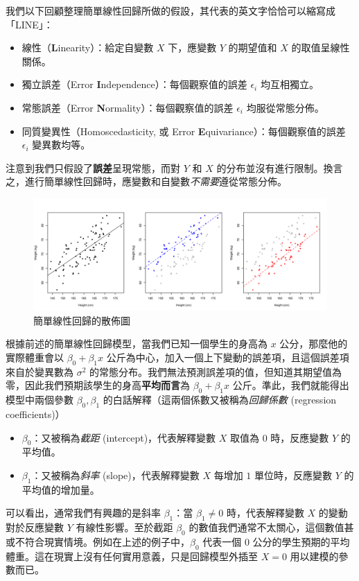     我們以下回顧整理簡單線性回歸所做的假設，其代表的英文字恰恰可以縮寫成「LINE」：
    \begin{itemize}
        \item 線性（\textbf{L}inearity）：給定自變數 $X$ 下，應變數 $Y$ 的期望值和 $X$ 的取值呈線性關係。
        \item 獨立誤差（Error \textbf{I}ndependence）：每個觀察值的誤差 $\epsilon_i$ 均互相獨立。
        \item 常態誤差（Error \textbf{N}ormality）：每個觀察值的誤差 $\epsilon_i$ 均服從常態分佈。
        \item 同質變異性（Homoscedasticity, 或 Error \textbf{E}quivariance）：每個觀察值的誤差 $\epsilon_i$ 變異數均等。
    \end{itemize}
    注意到我們只假設了\textbf{誤差}呈現常態，而對 $Y$ 和 $X$ 的分布並沒有進行限制。換言之，進行簡單線性回歸時，應變數和自變數\textit{不需要}遵從常態分佈。

    \begin{figure}[htbp]
        \centering
        \includegraphics[width=\textwidth]{figures/08-Correlation_linear_regression/regression.png}
        \caption{簡單線性回歸的散佈圖}
        \label{fig:SLR}
    \end{figure}

    根據前述的簡單線性回歸模型，當我們已知一個學生的身高為 $x$ 公分，那麼他的實際體重會以 $\beta_0 + \beta_1 x$ 公斤為中心，加入一個上下變動的誤差項，且這個誤差項來自於變異數為 $\sigma^2$ 的常態分布。我們無法預測誤差項的值，但知道其期望值為零，因此我們預期該學生的身高\textbf{平均而言}為 $\beta_0 + \beta_1 x$ 公斤。準此，我們就能得出模型中兩個參數 $\beta_0, \beta_1$ 的白話解釋（這兩個係數又被稱為\textit{回歸係數} (regression coefficients)）
    \begin{itemize}
        \item $\beta_0$：又被稱為\textit{截距} (intercept)，代表解釋變數 $X$ 取值為 $0$ 時，反應變數 $Y$ 的平均值。
        \item $\beta_1$：又被稱為\textit{斜率} (slope)，代表解釋變數 $X$ 每增加 $1$ 單位時，反應變數 $Y$ 的平均值的增加量。
    \end{itemize}
    可以看出，通常我們有興趣的是斜率 $\beta_1$：當 $\beta_1 \ne 0$ 時，代表解釋變數 $X$ 的變動對於反應變數 $Y$ 有線性影響。至於截距 $\beta_0$ 的數值我們通常不太關心，這個數值甚或不符合現實情境。例如在上述的例子中，$\beta_0$ 代表一個 $0$ 公分的學生預期的平均體重。這在現實上沒有任何實用意義，只是回歸模型外插至 $X=0$ 用以建模的參數而已。

